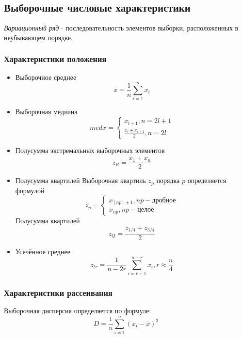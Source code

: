 \documentclass[12pt,a4paper]{article}
\begin{document}
\subsection{Выборочные числовые характеристики}
\textit{Вариационный ряд} - последовательность элементов выборки, расположенных в неубывающем порядке.

\subsubsection{Характеристики положения}
\begin{itemize}
    \item Выборочное среднее
        \begin{equation}
            \overline{x}=\frac{1}{n}\sum_{i=1}^{n}{x_i}
		\end{equation}
	\item Выборочная медиана
	    \begin{equation}
			med x=
			\begin{cases}
			    x_{l+1},n=2l+1\\
				\frac{x_l+x_{l+1}}{2},n=2l
			\end{cases}
		\end{equation}
	\item Полусумма экстремальных выборочных элементов
	    \begin{equation}
			z_R=\frac{x_1 + x_n}{2}
		\end{equation}
	\item Полусумма квартилей
	    \newline Выборочная квартиль $z_p$ порядка $p$ определяется формулой
	    \begin{equation}
		    z_p =
			\begin{cases}
			    x_{[np]+1},np-\text{дробное}\\
		      	x_{np},np-\text{целое}
	        \end{cases}
		\end{equation}
	    Полусумма квартилей
	    \begin{equation}
			z_Q=\frac{z_{1/4}+z_{3/4}}{2}
		\end{equation}
	\item Усечённое среднее
	    \begin{equation}
			z_{tr}=\frac{1}{n-2r}\sum_{i=r+1}^{n-r}{x_i}, r\approx\frac{n}{4}
		\end{equation}
\end{itemize}

\subsubsection{Характеристики рассеивания}
Выборочная дисперсия определяется по формуле:
\begin{equation}
    D=\frac{1}{n}\sum^{n}_{i=1}{(x_i-\overline{x})^2}
\end{equation}
\end{document}
